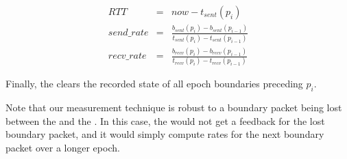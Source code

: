 \vspace{-10pt}
\begin{subequations}
    \begin{align}
        RTT &= &now -  t_{sent}(p_i)\\
        send\_rate &= &\frac{b_{sent}(p_i) - b_{sent}(p_{i-1})}{t_{sent}(p_i)-t_{sent}(p_{i-1})}\\
        recv\_rate &= &\frac{b_{recv}(p_i) - b_{recv}(p_{i-1})}{t_{recv}(p_i)-t_{recv}(p_{i-1})}
    \end{align}
\end{subequations}

Finally, the \inbox clears the recorded state of all epoch boundaries preceding $p_i$.

Note that our measurement technique is robust to a boundary packet being lost between the \inbox and the \outbox. In this case, the \inbox would not get a feedback for the lost boundary packet, and it would simply compute rates for the next boundary packet over a longer epoch. 



